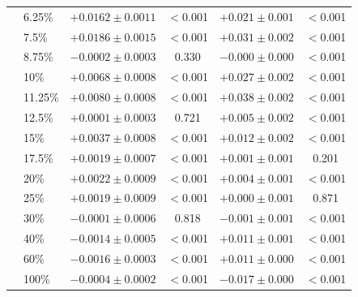 \begin{tabular}{llcccc}
 & 6.25\% & $+0.0162\pm0.0011$ & $<$0.001 & $+0.021\pm0.001$ & $<$0.001 \\
 & 7.5\% & $+0.0186\pm0.0015$ & $<$0.001 & $+0.031\pm0.002$ & $<$0.001 \\
 & 8.75\% & $-0.0002\pm0.0003$ & 0.330 & $-0.000\pm0.000$ & $<$0.001 \\
 & 10\% & $+0.0068\pm0.0008$ & $<$0.001 & $+0.027\pm0.002$ & $<$0.001 \\
 & 11.25\% & $+0.0080\pm0.0008$ & $<$0.001 & $+0.038\pm0.002$ & $<$0.001 \\
 & 12.5\% & $+0.0001\pm0.0003$ & 0.721 & $+0.005\pm0.002$ & $<$0.001 \\
 & 15\% & $+0.0037\pm0.0008$ & $<$0.001 & $+0.012\pm0.002$ & $<$0.001 \\
 & 17.5\% & $+0.0019\pm0.0007$ & $<$0.001 & $+0.001\pm0.001$ & 0.201 \\
 & 20\% & $+0.0022\pm0.0009$ & $<$0.001 & $+0.004\pm0.001$ & $<$0.001 \\
 & 25\% & $+0.0019\pm0.0009$ & $<$0.001 & $+0.000\pm0.001$ & 0.871 \\
 & 30\% & $-0.0001\pm0.0006$ & 0.818 & $-0.001\pm0.001$ & $<$0.001 \\
 & 40\% & $-0.0014\pm0.0005$ & $<$0.001 & $+0.011\pm0.001$ & $<$0.001 \\
 & 60\% & $-0.0016\pm0.0003$ & $<$0.001 & $+0.011\pm0.000$ & $<$0.001 \\
 & 100\% & $-0.0004\pm0.0002$ & $<$0.001 & $-0.017\pm0.000$ & $<$0.001 \\
\bottomrule
\end{tabular}